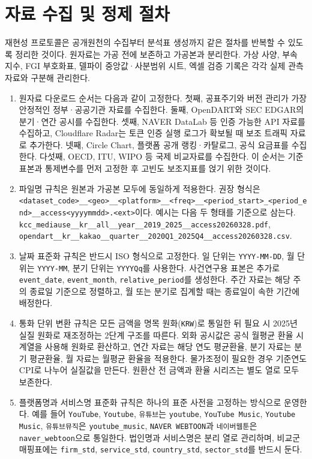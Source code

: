 \documentclass[11pt,a4paper]{report}
\begin{document}
\section{자료 수집 및 정제 절차}
재현성 프로토콜은 공개원천의 수집부터 분석표 생성까지 같은 절차를 반복할 수 있도록 정리한 것이다. 원자료는 가공 전에 보존하고 가공본과 분리한다. 가상 사양, 부속 지수, FGI 부호화표, 델파이 중앙값·사분범위 시트, 엑셀 검증 기록은 각각 실제 관측자료와 구분해 관리한다.
\begin{enumerate}[label=\arabic*.]
  \item 원자료 다운로드 순서는 다음과 같이 고정한다. 첫째, 공표주기와 버전 관리가 가장 안정적인 정부·공공기관 자료를 수집한다. 둘째, OpenDART와 SEC EDGAR의 분기·연간 공시를 수집한다. 셋째, NAVER DataLab 등 인증 가능한 API 자료를 수집하고, Cloudflare Radar는 토큰 인증 실행 로그가 확보될 때 보조 트래픽 자료로 추가한다. 넷째, Circle Chart, 플랫폼 공개 랭킹·카탈로그, 공식 요금표를 수집한다. 다섯째, OECD, ITU, WIPO 등 국제 비교자료를 수집한다. 이 순서는 기준 표본과 통제변수를 먼저 고정한 후 고빈도 보조지표를 얹기 위한 것이다.
  \item 파일명 규칙은 원본과 가공본 모두에 동일하게 적용한다. 권장 형식은 \nolinkurl{<dataset_code>__<geo>__<platform>__<freq>__<period_start>_<period_end>__access<yyyymmdd>.<ext>}이다. 예시는 다음 두 형태를 기준으로 삼는다. \nolinkurl{kcc_mediause__kr__all__year__2019_2025__access20260328.pdf}, \nolinkurl{opendart__kr__kakao__quarter__2020Q1_2025Q4__access20260328.csv}.
  \item 날짜 표준화 규칙은 반드시 ISO 형식으로 고정한다. 일 단위는 \texttt{YYYY-MM-DD}, 월 단위는 \texttt{YYYY-MM}, 분기 단위는 \texttt{YYYYQq}를 사용한다. 사건연구용 표본은 추가로 \texttt{event\_date}, \texttt{event\_month}, \texttt{relative\_period}를 생성한다. 주간 자료는 해당 주의 종료일 기준으로 정렬하고, 월 또는 분기로 집계할 때는 종료일이 속한 기간에 배정한다.
  \item 통화 단위 변환 규칙은 모든 금액을 명목 원화(\texttt{KRW})로 통일한 뒤 필요 시 2025년 실질 원화로 재조정하는 2단계 구조를 따른다. 외화 공시값은 공식 월평균 환율 시계열을 사용해 원화로 환산하고, 연간 자료는 해당 연도 평균환율, 분기 자료는 분기 평균환율, 월 자료는 월평균 환율을 적용한다. 물가조정이 필요한 경우 기준연도 CPI로 나누어 실질값을 만든다. 원환산 전 금액과 환율 시리즈는 별도 열로 모두 보존한다.
  \item 플랫폼명과 서비스명 표준화 규칙은 하나의 표준 사전을 고정하는 방식으로 운영한다. 예를 들어 \texttt{YouTube}, \texttt{Youtube}, \texttt{유튜브}는 \texttt{youtube}, \texttt{YouTube Music}, \texttt{Youtube Music}, \texttt{유튜브뮤직}은 \texttt{youtube\_music}, \texttt{NAVER WEBTOON}과 \texttt{네이버웹툰}은 \texttt{naver\_webtoon}으로 통일한다. 법인명과 서비스명은 분리 열로 관리하며, 비교군 매핑표에는 \texttt{firm\_std}, \texttt{service\_std}, \texttt{country\_std}, \texttt{sector\_std}를 반드시 둔다.

\end{enumerate}
\end{document}

